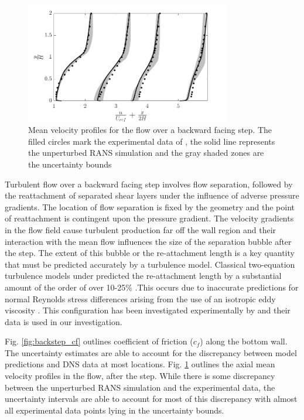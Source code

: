 \begin{figure}
\centering
\includegraphics[width=0.8\textwidth]{suthesis/images/backstep_vel_prof.png}
\caption{Mean velocity profiles for the flow over a backward facing step. The filled circles mark the experimental data of \cite{driver1985}, the solid line represents the unperturbed RANS simulation and the gray shaded zones are the uncertainty bounds\label{fig:backstep_vel_prof}}
\end{figure}

Turbulent flow over a backward facing step involves flow separation, followed by the reattachment of separated shear layers under the influence of adverse pressure gradients. The location of flow separation is fixed by the geometry and the point of reattachment is contingent upon the pressure gradient. The velocity gradients in the flow field cause turbulent production far off the wall region and their interaction with the mean flow influences the size of the separation bubble after the step. The extent of this bubble or the re-attachment length is a key quantity that must be predicted accurately by a turbulence model. Classical two-equation turbulence models under predicted the re-attachment length by a substantial amount of the order of over 10-25\% \cite{thangam1991}.This occurs due to inaccurate predictions for normal Reynolds stress differences arising from the use of an isotropic eddy viscosity \cite{thangam1991}. This configuration has been investigated experimentally by \cite{driver1985} and their data is used in our investigation.  


Fig. \ref{fig:backstep_cf} outlines coefficient of friction ($c_f$) along the bottom wall. The uncertainty estimates are able to account for the discrepancy between model predictions and DNS data at most locations. Fig. \ref{fig:backstep_vel_prof} outlines the axial mean velocity profiles in the flow, after the step. While there is some discrepancy between the unperturbed RANS simulation and the experimental data, the uncertainty intervals are able to account for most of this discrepancy with almost all experimental data points lying in the uncertainty bounds. 

